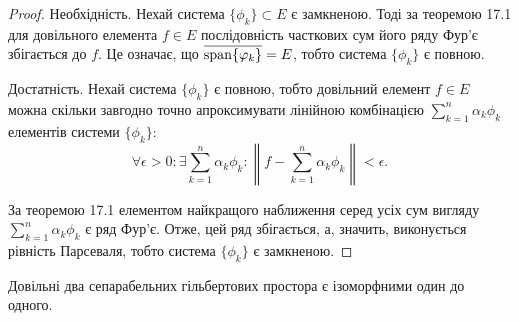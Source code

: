 \begin{proof}
Необхідність. Нехай система $\{\phi_k\} \subset E$ є
замкненою. Тоді за теоремою 17.1 для довільного елемента
$f \in E$ послідовність часткових сум його ряду Фур’є
збігається до $f$. Це означає, що $\overline{\operatorname{span} \{\varphi_k\}} = E$, тобто
система $\{\phi_k\}$ є повною.

Достатність. Нехай система $\{\phi_k\}$ є повною, тобто
довільний елемент $f \in E$ можна скільки завгодно точно
апроксимувати лінійною комбінацією $\sum_{k = 1}^n \alpha_k \phi_k$
елементів системи $\{\phi_k\}$:
\begin{equation*}
    \forall \epsilon > 0: \exists \sum_{k = 1}^n \alpha_k \phi_k:
    \left\| f - \sum_{k = 1}^n \alpha_k \phi_k \right\| < \epsilon.
\end{equation*}

За теоремою 17.1 елементом найкращого наближення
серед усіх сум вигляду $\sum_{k = 1}^n \alpha_k \phi_k$
є ряд Фур’є. Отже, цей ряд
збігається, а, значить, виконується рівність Парсеваля, тобто
система $\{\phi_k\}$ є замкненою.
\end{proof}

\begin{theorem}
 Довільні два сепарабельних
гільбертових простора є ізоморфними один до одного.
\end{theorem}

